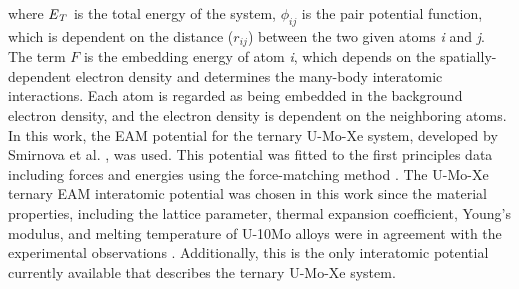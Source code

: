 \documentclass[preprint,12pt]{elsarticle}
\providecommand{\DIFadd}[1]{{\protect\color{blue} \sf #1}} %
\providecommand{\DIFaddbegin}{} %
\providecommand{\DIFaddend}{} %
\newcommand{\DIFaddincludegraphics}[2][]{{\color{blue}\fbox{\DIFOincludegraphics[#1]{#2}}}} %
\DeclareRobustCommand{\DIFaddbegin}{\DIFOaddbegin \let\includegraphics\DIFaddincludegraphics} %
\DeclareRobustCommand{\DIFaddend}{\DIFOaddend \let\includegraphics\DIFOincludegraphics} %
\begin{document}
\noindent where $\it{E}_{T}$ is the total energy of the system, $\phi_{ij}$ is the pair potential function, which is dependent on the distance ($r_{ij}$) between the two given atoms \textit{i} and \textit{j}. The term $F$ is the embedding energy of {atom \textit{i}}, which depends on the spatially-dependent electron density and determines the many-body interatomic interactions. Each atom is regarded as being embedded in the background electron density, and the electron density is dependent on the neighboring atoms. In this work, the EAM potential for the ternary U-Mo-Xe system, developed by Smirnova et al. \cite{smirnova2013ternary}, was used. This potential was fitted to the first principles data including forces and energies using the force-matching method \cite{ercolessi1994interatomic}. The U-Mo-Xe ternary EAM interatomic potential was chosen in this work since the material properties, including the lattice parameter, thermal expansion coefficient, Young's modulus, and melting temperature of U-10Mo alloys were in agreement with the experimental observations \cite{smirnova2013ternary}. Additionally, this is the only interatomic potential \DIFaddbegin \DIFadd{currently available }\DIFaddend that describes the ternary U-Mo-Xe system.
\end{document}
